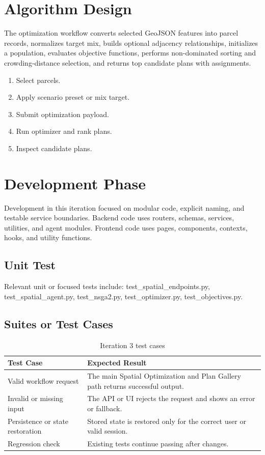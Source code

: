 \documentclass[12pt,a4paper,oneside]{report}
\begin{document}
\section{Algorithm Design}
The optimization workflow converts selected GeoJSON features into parcel records, normalizes target mix, builds optional adjacency relationships, initializes a population, evaluates objective functions, performs non-dominated sorting and crowding-distance selection, and returns top candidate plans with assignments.
\begin{enumerate}

\item Select parcels.

\item Apply scenario preset or mix target.

\item Submit optimization payload.

\item Run optimizer and rank plans.

\item Inspect candidate plans.

\end{enumerate}

\section{Development Phase}
Development in this iteration focused on modular code, explicit naming, and testable service boundaries. Backend code uses routers, schemas, services, utilities, and agent modules. Frontend code uses pages, components, contexts, hooks, and utility functions.

\subsection{Unit Test}
Relevant unit or focused tests include: test\_spatial\_endpoints.py, test\_spatial\_agent.py, test\_nsga2.py, test\_optimizer.py, test\_objectives.py.

\subsection{Suites or Test Cases}
\begin{longtable}{p{}p{}}
\caption{Iteration 3 test cases}\\
\toprule
Test Case & Expected Result \\
\midrule

Valid workflow request & The main Spatial Optimization and Plan Gallery path returns successful output. \\

Invalid or missing input & The API or UI rejects the request and shows an error or fallback. \\
Persistence or state restoration & Stored state is restored only for the correct user or valid session. \\
Regression check & Existing tests continue passing after changes. \\
\bottomrule
\end{longtable}
\end{document}
